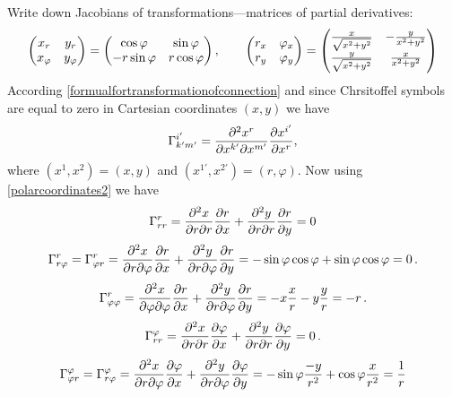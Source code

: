 \documentclass[12pt]{article}
\theoremstyle{theorem}
\numberwithin{equation}{section}
\begin{document}
Write down Jacobians of transformations---matrices of partial derivatives:
                      \begin{equation}\label{polarcoordinates2}
                      \begin{pmatrix}
                      x_r &y_r\cr
                      x_\varphi &y_\varphi\cr
                      \end{pmatrix}=
                      \begin{pmatrix}
                      \cos\varphi &\sin\varphi\cr
                      -r\sin\varphi & r\cos\varphi\cr
                      \end{pmatrix},\qquad
                      \begin{pmatrix}
                      r_x &\varphi_x\cr
                      r_y &\varphi_y\cr
                      \end{pmatrix}=
                      \begin{pmatrix}
                      {x\over \sqrt{x^2+y^2}} &-{y\over {x^2+y^2}}\cr
                      {y\over \sqrt{x^2+y^2}} & {x\over {x^2+y^2}}\cr
                      \end{pmatrix}
                      \end{equation}
According \eqref{formualfortransformationofconnection} and since Chrsitoffel symbols are equal to zero in Cartesian coordinates
$(x,y)$ we have
             \begin{equation}\label{christoffelsymbolsinpolarcoordinates}
\Gamma^{i'}_{k'm'}=
    {\partial^2  x^r\over \partial x^{k'}\partial x^{m'}}{\partial x^{i'}\over \partial x^r},
                             \end{equation}
           where $(x^{1},x^{2})=(x,y)$ and $(x^{1'},x^{2'})=(r,\varphi)$. Now using \eqref{polarcoordinates2}
           we have
            $$
         \Gamma^r_{rr}={\partial^2 x\over \partial r\partial r}{\partial r\over \partial x}+{\partial^2 y\over \partial r\partial r}{\partial r\over \partial y}=0
            $$
              $$
        \Gamma^r_{r \varphi}=\Gamma^r_{\varphi r}={\partial^2 x\over \partial r\partial \varphi}{\partial r\over \partial x}+
        {\partial^2 y\over \partial r\partial \varphi}{\partial r\over \partial y}=-\sin\varphi\cos\varphi+\sin\varphi\cos\varphi=0\,.
              $$
               $$
           \Gamma^r_{\varphi \varphi}={\partial^2 x\over \partial \varphi\partial \varphi}{\partial r\over \partial x}+
        {\partial^2 y\over \partial r\partial \varphi}{\partial r\over \partial y}=-x{x\over r}-y{y\over r}=-r\,.
               $$
                $$
                 \Gamma^\varphi_{rr}=
        {\partial^2 x\over \partial r\partial r}{\partial \varphi\over \partial x}+{\partial^2 y\over \partial r\partial r}{\partial \varphi\over \partial y}=0\,.
                $$
                $$
     \Gamma^\varphi_{\varphi r}=
     \Gamma^\varphi_{r\varphi}=
        {\partial^2 x\over \partial r\partial \varphi}{\partial \varphi\over \partial x}+{\partial^2 y\over \partial r\partial \varphi}{\partial \varphi\over \partial y}=
        -\sin\varphi{-y\over r^2}+\cos\varphi{x\over r^2}={1\over r}
                $$
\end{document}
